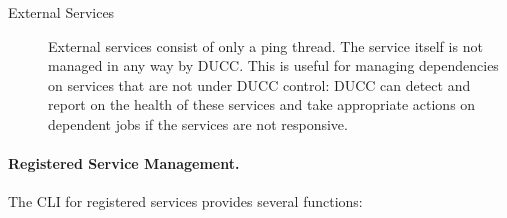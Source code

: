 \begin{description}
          \item[External Services] External services consist of only a ping thread.  The service
            itself is not managed in any way by DUCC.  This is useful for managing dependencies
            on services that are not under DUCC control: DUCC can detect and report on the health
            of these services and take appropriate actions on dependent jobs if the services
            are not responsive.
      \end{description}
          
    \paragraph{Registered Service Management.} The CLI for registered services provides several functions:


